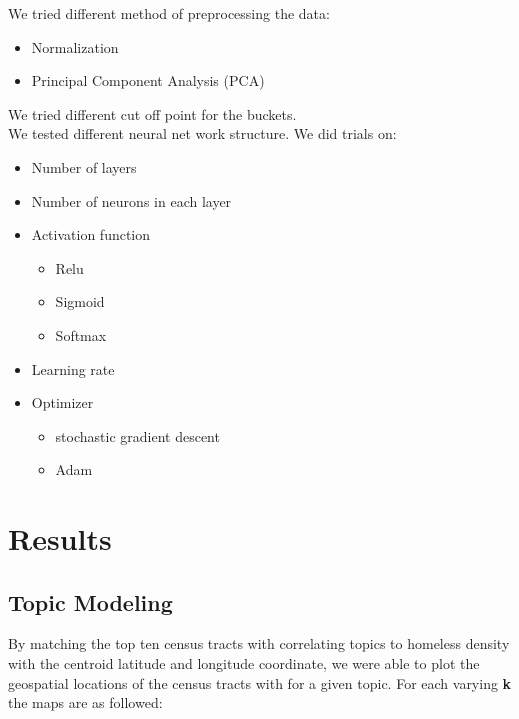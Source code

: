 \documentclass[11pt,letterpaper]{article}
\begin{document}
We tried different method of preprocessing the data:
\begin{itemize}
\item Normalization
\item Principal Component Analysis (PCA)
\end{itemize}
We tried different cut off point for the buckets.\\
We tested different neural net work structure. We did trials on:
\begin{itemize}
\item Number of layers
\item Number of neurons in each layer
\item Activation function
	\begin{itemize}
	\item Relu
	\item Sigmoid
	\item Softmax
	\end{itemize}
\item Learning rate
\item Optimizer
	\begin{itemize}
	\item stochastic gradient descent
	\item Adam
	\end{itemize}
\end{itemize}

\section{Results}

\subsection{Topic Modeling}
By matching the top ten census tracts with correlating topics to homeless density with the centroid latitude and longitude coordinate, we were able to plot the geospatial locations of the census tracts with for a given topic. For each varying \textbf{k} the maps are as followed:
\end{document}
